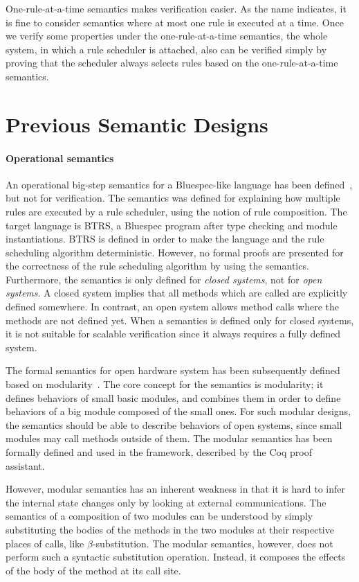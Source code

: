 One-rule-at-a-time semantics makes verification easier. As the name
indicates, it is fine to consider semantics where at most one rule is
executed at a time. Once we verify some properties under the
one-rule-at-a-time semantics, the whole system, in which a rule
scheduler is attached, also can be verified simply by proving that the
scheduler always selects rules based on the one-rule-at-a-time
semantics.

\section{Previous Semantic Designs}
\label{sec:related-works}

\paragraph{Operational semantics}

An operational big-step semantics for a Bluespec-like language has
been defined~\cite{nirav-memocode}, but not for verification. The
semantics was defined for explaining how multiple rules are executed
by a rule scheduler, using the notion of rule composition. The target
language is BTRS, a Bluespec program after type checking and module
instantiations. BTRS is defined in order to make the language and the
rule scheduling algorithm deterministic. However, no formal proofs are
presented for the correctness of the rule scheduling algorithm by
using the semantics. Furthermore, the semantics is only defined for
\emph{closed systems}, not for \emph{open systems}. A closed system
implies that all methods which are called are explicitly defined
somewhere. In contrast, an open system allows method calls where the
methods are not defined yet. When a semantics is defined only for
closed systems, it is not suitable for scalable verification since it
always requires a fully defined system.

The formal semantics for open hardware system has been subsequently
defined based on modularity~\cite{murali-thesis}. The core concept for
the semantics is modularity; it defines behaviors of small basic
modules, and combines them in order to define behaviors of a big
module composed of the small ones. For such modular designs, the
semantics should be able to describe behaviors of open systems, since
small modules may call methods outside of them. The modular semantics
has been formally defined and used in the \Kami{} framework, described
by the Coq proof assistant.

However, modular semantics has an inherent weakness in that it is hard
to infer the internal state changes only by looking at external
communications. The semantics of a composition of two modules can be
understood by simply substituting the bodies of the methods in the two
modules at their respective places of calls, like
$\beta$-substitution. The modular semantics, however, does not perform
such a syntactic substitution operation. Instead, it composes the
effects of the body of the method at its call site.

